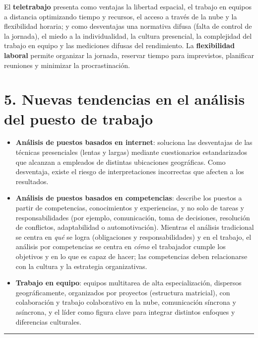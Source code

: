 \documentclass[12pt]{book} %
\providecommand{\tightlist}{%
  \setlength{\itemsep}{0pt}\setlength{\parskip}{0pt}}
\begin{document}
El \textbf{teletrabajo} presenta como ventajas la libertad espacial, el
trabajo en equipos a distancia optimizando tiempo y recursos, el acceso
a través de la nube y la flexibilidad horaria; y como desventajas una
normativa difusa (falta de control de la jornada), el miedo a la
individualidad, la cultura presencial, la complejidad del trabajo en
equipo y las mediciones difusas del rendimiento. La \textbf{flexibilidad
laboral} permite organizar la jornada, reservar tiempo para imprevistos,
planificar reuniones y minimizar la procrastinación.

\hypertarget{nuevas-tendencias-en-el-anuxe1lisis-del-puesto-de-trabajo}{%
\section{5. Nuevas tendencias en el análisis del puesto de
trabajo}\label{nuevas-tendencias-en-el-anuxe1lisis-del-puesto-de-trabajo}}

\begin{itemize}
\tightlist
\item
  \textbf{Análisis de puestos basados en internet}: soluciona las
  desventajas de las técnicas presenciales (lentas y largas) mediante
  cuestionarios estandarizados que alcanzan a empleados de distintas
  ubicaciones geográficas. Como desventaja, existe el riesgo de
  interpretaciones incorrectas que afecten a los resultados.
\item
  \textbf{Análisis de puestos basados en competencias}: describe los
  puestos a partir de competencias, conocimientos y experiencias, y no
  solo de tareas y responsabilidades (por ejemplo, comunicación, toma de
  decisiones, resolución de conflictos, adaptabilidad o automotivación).
  Mientras el análisis tradicional se centra en \emph{qué} se logra
  (obligaciones y responsabilidades) y en el trabajo, el análisis por
  competencias se centra en \emph{cómo} el trabajador cumple los
  objetivos y en lo que es capaz de hacer; las competencias deben
  relacionarse con la cultura y la estrategia organizativas.
\item
  \textbf{Trabajo en equipo}: equipos multitarea de alta
  especialización, dispersos geográficamente, organizados por proyectos
  (estructura matricial), con colaboración y trabajo colaborativo en la
  nube, comunicación síncrona y asíncrona, y el líder como figura clave
  para integrar distintos enfoques y diferencias culturales.
\end{itemize}

\begin{center}\rule{0.5\linewidth}{0.5pt}\end{center}
\end{document}
